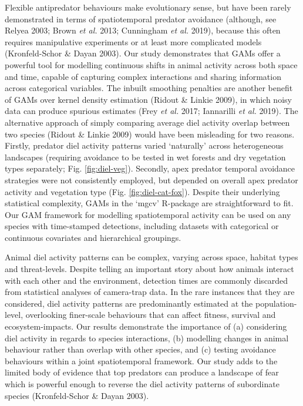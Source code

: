 \documentclass[]{elsarticle} %
\begin{document}
Flexible antipredator behaviours make evolutionary sense, but have been rarely demonstrated in terms of spatiotemporal predator avoidance (although, see Relyea 2003; Brown \emph{et al.} 2013; Cunningham \emph{et al.} 2019), because this often requires manipulative experiments or at least more complicated models (Kronfeld-Schor \& Dayan 2003). Our study demonstrates that GAMs offer a powerful tool for modelling continuous shifts in animal activity across both space and time, capable of capturing complex interactions and sharing information across categorical variables. The inbuilt smoothing penalties are another benefit of GAMs over kernel density estimation (Ridout \& Linkie 2009), in which noisy data can produce spurious estimates (Frey \emph{et al.} 2017; Iannarilli \emph{et al.} 2019). The alternative approach of simply comparing average diel activity overlap between two species (Ridout \& Linkie 2009) would have been misleading for two reasons. Firstly, predator diel activity patterns varied `naturally' across heterogeneous landscapes (requiring avoidance to be tested in wet forests and dry vegetation types separately; Fig. \ref{fig:diel-veg}). Secondly, apex predator temporal avoidance strategies were not consistently employed, but depended on overall apex predator activity and vegetation type (Fig. \ref{fig:diel-cat-fox}). Despite their underlying statistical complexity, GAMs in the `mgcv' R-package are straightforward to fit. Our GAM framework for modelling spatiotemporal activity can be used on any species with time-stamped detections, including datasets with categorical or continuous covariates and hierarchical groupings.

Animal diel activity patterns can be complex, varying across space, habitat types and threat-levels. Despite telling an important story about how animals interact with each other and the environment, detection times are commonly discarded from statistical analyses of camera-trap data. In the rare instances that they are considered, diel activity patterns are predominantly estimated at the population-level, overlooking finer-scale behaviours that can affect fitness, survival and ecosystem-impacts. Our results demonstrate the importance of (a) considering diel activity in regards to species interactions, (b) modelling changes in animal behaviour rather than overlap with other species, and (c) testing avoidance behaviours within a joint spatiotemporal framework. Our study adds to the limited body of evidence that top predators can produce a landscape of fear which is powerful enough to reverse the diel activity patterns of subordinate species (Kronfeld-Schor \& Dayan 2003).
\end{document}
